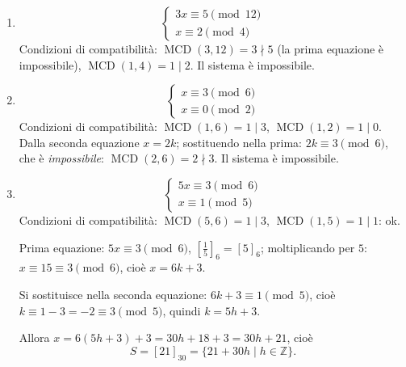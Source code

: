 \documentclass[11pt,a4paper]{article}
\begin{document}
\begin{esempio}
\begin{enumerate}
  \item
  \[
    \begin{cases} 3x \equiv 5 \pmod{12} \\ x \equiv 2 \pmod 4 \end{cases}
  \]
  Condizioni di compatibilità: $\operatorname{MCD}(3, 12) = 3 \nmid 5$ (la prima equazione è impossibile), $\operatorname{MCD}(1, 4) = 1 \mid 2$. Il sistema è impossibile.
  \item
  \[
    \begin{cases} x \equiv 3 \pmod 6 \\ x \equiv 0 \pmod 2 \end{cases}
  \]
  Condizioni di compatibilità: $\operatorname{MCD}(1, 6) = 1 \mid 3$, $\operatorname{MCD}(1, 2) = 1 \mid 0$. Dalla seconda equazione $x = 2k$; sostituendo nella prima: $2k \equiv 3 \pmod 6$, che è \emph{impossibile}: $\operatorname{MCD}(2, 6) = 2 \nmid 3$. Il sistema è impossibile.
  \item
  \[
    \begin{cases} 5x \equiv 3 \pmod 6 \\ x \equiv 1 \pmod 5 \end{cases}
  \]
  Condizioni di compatibilità: $\operatorname{MCD}(5, 6) = 1 \mid 3$, $\operatorname{MCD}(1, 5) = 1 \mid 1$: ok.

  Prima equazione: $5x \equiv 3 \pmod 6$, $\left[\tfrac{1}{5}\right]_6 = [5]_6$; moltiplicando per $5$: $x \equiv 15 \equiv 3 \pmod 6$, cioè $x = 6k + 3$.

  Si sostituisce nella seconda equazione: $6k + 3 \equiv 1 \pmod 5$, cioè $k \equiv 1 - 3 = -2 \equiv 3 \pmod 5$, quindi $k = 5h + 3$.

  Allora $x = 6(5h + 3) + 3 = 30h + 18 + 3 = 30h + 21$, cioè
  \[
    S = [21]_{30} = \{21 + 30h \mid h \in \mathbb{Z}\}.
  \]
\end{enumerate}
\end{esempio}
\end{document}
